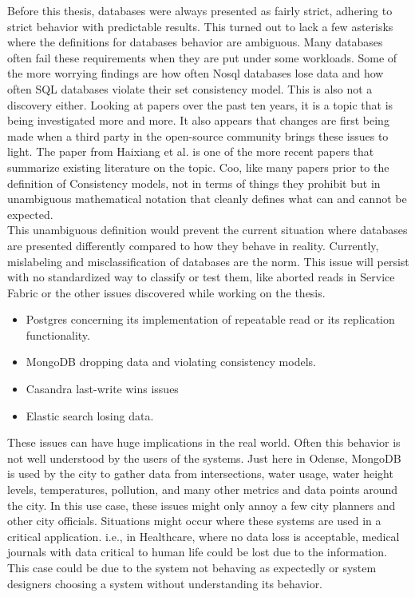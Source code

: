 \documentclass[a4paper,10pt,titlepage]{report}
\begin{document}
Before this thesis, databases were always presented as fairly strict, adhering to strict behavior with predictable results. This turned out to lack a few asterisks where the definitions for databases behavior are ambiguous. Many databases often fail these requirements when they are put under some workloads. Some of the more worrying findings are how often Nosql databases lose data and how often SQL databases violate their set consistency model. This is also not a discovery either. Looking at papers over the past ten years, it is a topic that is being investigated more and more. It also appears that changes are first being made when a third party in the open-source community brings these issues to light. The paper from Haixiang et al. \cite{li2021coo} is one of the more recent papers that summarize existing literature on the topic. Coo, like many papers prior to the definition of Consistency models, not in terms of things they prohibit but in unambiguous mathematical notation that cleanly defines what can and cannot be expected.\\
\vspace{5mm}
This unambiguous definition would prevent the current situation where databases are presented differently compared to how they behave in reality. Currently, mislabeling and misclassification of databases are the norm. This issue will persist with no standardized way to classify or test them, like aborted reads in Service Fabric or the other issues discovered while working on the thesis. \\\vspace{5mm}
\begin{itemize}
    \item Postgres concerning its implementation of repeatable read or its replication functionality.
    \item MongoDB dropping data and violating consistency models.
    \item Casandra last-write wins issues
    \item Elastic search losing data.
\end{itemize}

These issues can have huge implications in the real world. Often this behavior is not well understood by the users of the systems. Just here in Odense, MongoDB is used by the city to gather data from intersections, water usage, water height levels, temperatures, pollution, and many other metrics and data points around the city. In this use case, these issues might only annoy a few city planners and other city officials. Situations might occur where these systems are used in a critical application. i.e., in Healthcare, where no data loss is acceptable, medical journals with data critical to human life could be lost due to the information. This case could be due to the system not behaving as expectedly or system designers choosing a system without understanding its behavior.
\end{document}
